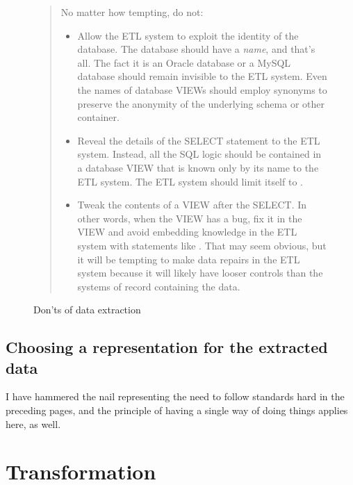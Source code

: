\documentclass[11pt,letterpaper,twosided]{memoir}
\begin{document}
\begin{figure}
\begin{framed}
\begin{quote}
No matter how tempting, do not:

\small
\begin{itemize}

\item Allow the ETL system to exploit the identity of the database.
The database should have a \emph{name}, and that's all. The fact it
is an Oracle database or a MySQL database should remain invisible
to the ETL system. Even the names of database VIEWs should employ 
synonyms to preserve the anonymity of the underlying schema or
other container. 

\item Reveal the details of the SELECT statement to the ETL system.
Instead, all the SQL logic should be contained in a database VIEW
that is known only by its name to the ETL system. The ETL system
should limit itself to .

\item Tweak the contents of a VIEW after the SELECT. In other words,
when the VIEW has a bug, fix it in the VIEW and avoid embedding
knowledge in the ETL system with statements like .  That may seem obvious, but
it will be tempting to make data repairs in the ETL system because
it will likely have looser controls than the systems of record
containing the data.

\end{itemize}
\end{quote}
\caption{Don'ts of data extraction}
\label{fig:donts}
\end{framed}
\end{figure}

\subsection{Choosing a representation for the extracted data}

I have hammered the nail representing the need to follow standards 
hard in the preceding pages, and the principle of having a single
way of doing things applies here, as well.

\section{Transformation}
\end{document}
